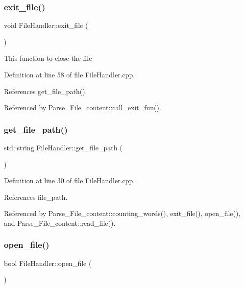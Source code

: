 \subsubsection{\texorpdfstring{exit\+\_\+file()}{exit\_file()}}
{\footnotesize\ttfamily void File\+Handler\+::exit\+\_\+file (\begin{DoxyParamCaption}{ }\end{DoxyParamCaption})}

This function to close the file 

Definition at line 58 of file File\+Handler.\+cpp.



References get\+\_\+file\+\_\+path().



Referenced by Parse\+\_\+\+File\+\_\+content\+::call\+\_\+exit\+\_\+fun().

\mbox{\label{class_file_handler_ad3960a2c229347073f6ffc53e0ebceec}} 
\subsubsection{\texorpdfstring{get\+\_\+file\+\_\+path()}{get\_file\_path()}}
{\footnotesize\ttfamily std\+::string File\+Handler\+::get\+\_\+file\+\_\+path (\begin{DoxyParamCaption}{ }\end{DoxyParamCaption})}



Definition at line 30 of file File\+Handler.\+cpp.



References file\+\_\+path.



Referenced by Parse\+\_\+\+File\+\_\+content\+::counting\+\_\+words(), exit\+\_\+file(), open\+\_\+file(), and Parse\+\_\+\+File\+\_\+content\+::read\+\_\+file().

\mbox{\label{class_file_handler_aefc9976ff2b2788298a65eba6d6d27a2}} 
\subsubsection{\texorpdfstring{open\+\_\+file()}{open\_file()}}
{\footnotesize\ttfamily bool File\+Handler\+::open\+\_\+file (\begin{DoxyParamCaption}{ }\end{DoxyParamCaption})}




